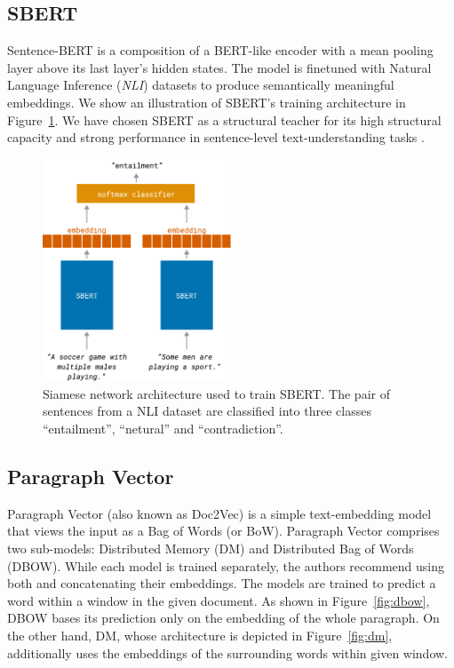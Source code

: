 \subsection{SBERT}

Sentence-BERT is a composition of a BERT-like \citep{devlin2019bert} encoder
with a mean pooling layer above its last layer's hidden states. The model is
finetuned with Natural Language Inference (\emph{NLI}) datasets to produce
semantically meaningful embeddings. We show an illustration of SBERT's training
architecture in Figure~\ref{fig:sbert}. We have chosen SBERT as a structural
teacher for its high structural capacity and strong performance in
sentence-level text-understanding tasks \citep{reimers2019sentence}.

\begin{figure}
  \centering
  \includegraphics[width=0.5\textwidth]{./img/sbert_architecture.pdf}

  \caption{Siamese network architecture used to train SBERT. The pair of
  sentences from a NLI dataset are classified into three classes
  ``entailment'', ``netural'' and ``contradiction''.}

  \label{fig:sbert}

\end{figure}

\subsection{Paragraph Vector}\label{section:paragraph_vector}

Paragraph Vector \citep{le2014distributed} (also known as Doc2Vec) is a simple
text-embedding model that views the input as a Bag of Words (or BoW). Paragraph
Vector comprises two sub-models: Distributed Memory (DM) and Distributed Bag of
Words (DBOW). While each model is trained separately, the authors recommend
using both and concatenating their embeddings. The models are trained to
predict a word within a window in the given document. As shown in
Figure~\ref{fig:dbow}, DBOW bases its prediction only on the embedding of the
whole paragraph. On the other hand, DM, whose architecture is depicted in
Figure~\ref{fig:dm}, additionally uses the embeddings of the surrounding words
within given window.

